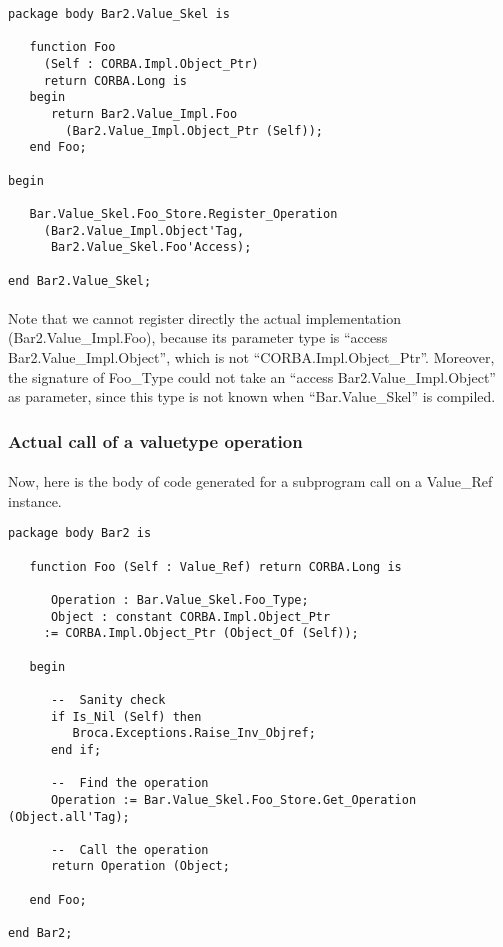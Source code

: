 \begin{verbatim}
package body Bar2.Value_Skel is

   function Foo
     (Self : CORBA.Impl.Object_Ptr)
     return CORBA.Long is
   begin
      return Bar2.Value_Impl.Foo
        (Bar2.Value_Impl.Object_Ptr (Self));
   end Foo;

begin
	
   Bar.Value_Skel.Foo_Store.Register_Operation
     (Bar2.Value_Impl.Object'Tag,
      Bar2.Value_Skel.Foo'Access);

end Bar2.Value_Skel;
\end{verbatim}

\paragraph{} Note that we cannot register directly the actual
implementation (Bar2.Value\_Impl.Foo), because its parameter type is
``access Bar2.Value\_Impl.Object'', which is not
``CORBA.Impl.\-Object\_Ptr''. Moreover, the signature of Foo\_Type could
not take an ``access Bar2.Value\_Impl.\-Object'' as parameter, since
this type is not known when ``Bar.Value\_Skel'' is compiled.

\subsubsection{Actual call of a valuetype operation}
\paragraph{}Now, here is the body of code generated for a subprogram
call on a Value\_Ref instance.

\begin{verbatim}
package body Bar2 is

   function Foo (Self : Value_Ref) return CORBA.Long is

      Operation : Bar.Value_Skel.Foo_Type;
      Object : constant CORBA.Impl.Object_Ptr
	 := CORBA.Impl.Object_Ptr (Object_Of (Self));

   begin

      --  Sanity check
      if Is_Nil (Self) then
         Broca.Exceptions.Raise_Inv_Objref;
      end if;

      --  Find the operation
      Operation := Bar.Value_Skel.Foo_Store.Get_Operation (Object.all'Tag);

      --  Call the operation
      return Operation (Object;

   end Foo;

end Bar2;
\end{verbatim}

